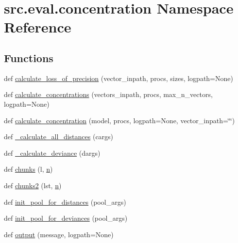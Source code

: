 \hypertarget{namespacesrc_1_1eval_1_1concentration}{}\section{src.\+eval.\+concentration Namespace Reference}
\label{namespacesrc_1_1eval_1_1concentration}
\subsection*{Functions}
\begin{DoxyCompactItemize}
\item 
def \hyperlink{namespacesrc_1_1eval_1_1concentration_a39d2edb93fad1c1766b1107c9954c1f3}{calculate\+\_\+loss\+\_\+of\+\_\+precision} (vector\+\_\+inpath, procs, sizes, logpath=None)
\item 
def \hyperlink{namespacesrc_1_1eval_1_1concentration_a2f99b5b9b58322935a7ca7bb766cbbb9}{calculate\+\_\+concentrations} (vectors\+\_\+inpath, procs, max\+\_\+n\+\_\+vectors, logpath=None)
\item 
def \hyperlink{namespacesrc_1_1eval_1_1concentration_a33987fe9eae3decb05601e868dfad18d}{calculate\+\_\+concentration} (model, procs, logpath=None, vector\+\_\+inpath=\char`\"{}\char`\"{})
\item 
def \hyperlink{namespacesrc_1_1eval_1_1concentration_ab24bba4b57c8a848405d5d9c31b31525}{\+\_\+calculate\+\_\+all\+\_\+distances} (cargs)
\item 
def \hyperlink{namespacesrc_1_1eval_1_1concentration_ac5dd136b31204c794d232af89857bd7a}{\+\_\+calculate\+\_\+deviance} (dargs)
\item 
def \hyperlink{namespacesrc_1_1eval_1_1concentration_a235768292b5e81872b7caba8f9f37e64}{chunks} (l, \hyperlink{namespacesrc_1_1eval_1_1concentration_a31fc2d0b98a6e58bf5930064d0ce250c}{n})
\item 
def \hyperlink{namespacesrc_1_1eval_1_1concentration_a55c484721d01a583be952ac6206e659b}{chunks2} (lst, \hyperlink{namespacesrc_1_1eval_1_1concentration_a31fc2d0b98a6e58bf5930064d0ce250c}{n})
\item 
def \hyperlink{namespacesrc_1_1eval_1_1concentration_a1ea43a2b9635093100411e9e2ec40bb0}{init\+\_\+pool\+\_\+for\+\_\+distances} (pool\+\_\+args)
\item 
def \hyperlink{namespacesrc_1_1eval_1_1concentration_a916888eea5c2c3033aa8fcbcba31c200}{init\+\_\+pool\+\_\+for\+\_\+deviances} (pool\+\_\+args)
\item 
def \hyperlink{namespacesrc_1_1eval_1_1concentration_aef7e62814401c5b3f733b09223cbea37}{output} (message, logpath=None)

\end{DoxyCompactItemize}
